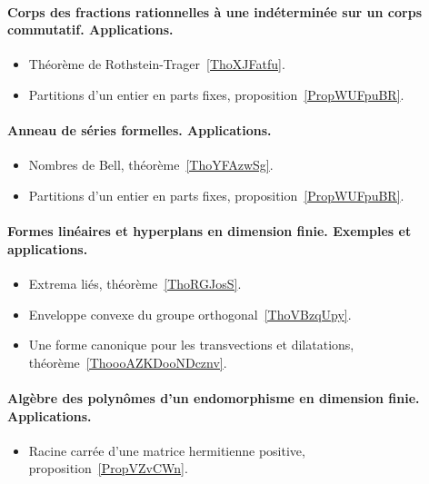 \paragraph{Corps des fractions rationnelles à une indéterminée sur un corps commutatif. Applications.}
\begin{itemize}
    \item Théorème de Rothstein-Trager~\ref{ThoXJFatfu}.
    \item Partitions d'un entier en parts fixes, proposition~\ref{PropWUFpuBR}.
\end{itemize}

\paragraph{Anneau de séries formelles. Applications.}
\begin{itemize}
    \item Nombres de Bell, théorème~\ref{ThoYFAzwSg}.
    \item Partitions d'un entier en parts fixes, proposition~\ref{PropWUFpuBR}.
\end{itemize}
\paragraph{Formes linéaires et hyperplans en dimension finie. Exemples et applications.}
\begin{itemize}
    \item Extrema liés, théorème~\ref{ThoRGJosS}.
    \item Enveloppe convexe du groupe orthogonal~\ref{ThoVBzqUpy}.
    \item Une forme canonique pour les transvections et dilatations, théorème~\ref{ThoooAZKDooNDcznv}.
\end{itemize}
\paragraph{Algèbre des polynômes d'un endomorphisme en dimension finie. Applications.}
\begin{itemize}
    \item Racine carrée d'une matrice hermitienne positive, proposition~\ref{PropVZvCWn}.
\end{itemize}
